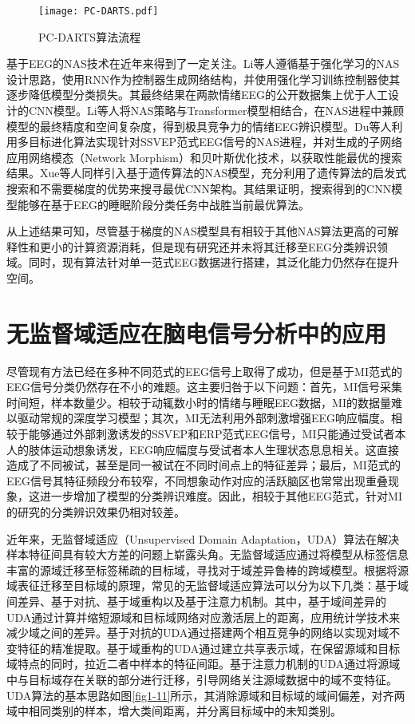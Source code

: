 \begin{figure}[!h]
	\centering
	\texttt{[image: PC-DARTS.pdf]}
	\caption{PC-DARTS算法流程\cite{3-7}}
	\label{fig1-10}
\end{figure}

基于EEG的NAS技术在近年来得到了一定关注。Li等人\cite{1-83}遵循基于强化学习的NAS\cite{1-79}设计思路，使用RNN作为控制器生成网络结构，并使用强化学习训练控制器使其逐步降低模型分类损失。其最终结果在两款情绪EEG的公开数据集上优于人工设计的CNN模型。Li等人\cite{1-84}将NAS策略与Transformer模型相结合，在NAS进程中兼顾模型的最终精度和空间复杂度，得到极具竞争力的情绪EEG辨识模型。Du等人\cite{1-85}利用多目标进化算法实现针对SSVEP范式EEG信号的NAS进程，并对生成的子网络应用网络模态（Network Morphism）和贝叶斯优化技术，以获取性能最优的搜索结果。Xue等人\cite{1-86}同样引入基于遗传算法的NAS模型，充分利用了遗传算法的启发式搜索和不需要梯度的优势来搜寻最优CNN架构。其结果证明，搜索得到的CNN模型能够在基于EEG的睡眠阶段分类任务中战胜当前最优算法。

从上述结果可知，尽管基于梯度的NAS模型具有相较于其他NAS算法更高的可解释性和更小的计算资源消耗，但是现有研究还并未将其迁移至EEG分类辨识领域。同时，现有算法针对单一范式EEG数据进行搭建，其泛化能力仍然存在提升空间。

\section{无监督域适应在脑电信号分析中的应用}
尽管现有方法已经在多种不同范式的EEG信号上取得了成功，但是基于MI范式的EEG信号分类仍然存在不小的难题。这主要归咎于以下问题：首先，MI信号采集时间短，样本数量少。相较于动辄数小时的情绪与睡眠EEG数据，MI的数据量难以驱动常规的深度学习模型；其次，MI无法利用外部刺激增强EEG响应幅度。相较于能够通过外部刺激诱发的SSVEP和ERP范式EEG信号，MI只能通过受试者本人的肢体运动想象诱发，EEG响应幅度与受试者本人生理状态息息相关。这直接造成了不同被试，甚至是同一被试在不同时间点上的特征差异；最后，MI范式的EEG信号其特征频段分布较窄，不同想象动作对应的活跃脑区也常常出现重叠现象，这进一步增加了模型的分类辨识难度。因此，相较于其他EEG范式，针对MI的研究的分类辨识效果仍相对较差\cite{1-51,1-59,1-71,1-75}。

近年来，无监督域适应（Unsupervised Domain Adaptation，UDA）算法在解决样本特征间具有较大方差的问题上崭露头角。无监督域适应通过将模型从标签信息丰富的源域迁移至标签稀疏的目标域，寻找对于域差异鲁棒的跨域模型。根据将源域表征迁移至目标域的原理，常见的无监督域适应算法可以分为以下几类：基于域间差异、基于对抗、基于域重构以及基于注意力机制\cite{1-89}。其中，基于域间差异的UDA通过计算并缩短源域和目标域网络对应激活层上的距离，应用统计学技术来减少域之间的差异\cite{1-90}。基于对抗的UDA通过搭建两个相互竞争的网络以实现对域不变特征的精准提取\cite{1-91}。基于域重构的UDA通过建立共享表示域，在保留源域和目标域特点的同时，拉近二者中样本的特征间距\cite{1-92}。基于注意力机制的UDA通过将源域中与目标域存在关联的部分进行迁移，引导网络关注源域数据中的域不变特征\cite{1-93}。UDA算法的基本思路如图\ref{fig1-11}所示，其消除源域和目标域的域间偏差，对齐两域中相同类别的样本，增大类间距离，并分离目标域中的未知类别。

